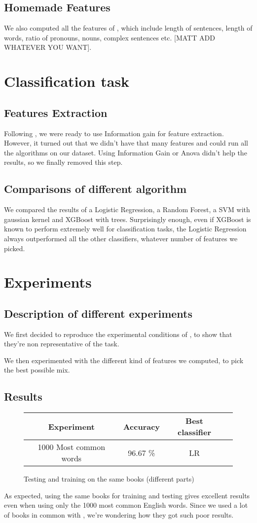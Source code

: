 \documentclass[10pt]{article}
\begin{document}
\subsection{Homemade Features}
We also computed all the features of \cite{homemade}, which include length of sentences, length of words, ratio of pronouns, nouns, complex sentences etc. [MATT ADD WHATEVER YOU WANT].

\section{Classification task}
\subsection{Features Extraction}
Following \cite{Parse}, we were ready to use Information gain for feature extraction. However, it turned out that we didn't have that many features and could run all the algorithms on our dataset. Using Information Gain or Anova didn't help the results, so we finally removed this step.

\subsection{Comparisons of different algorithm}
We compared the results of a Logistic Regression, a Random Forest, a SVM with gaussian kernel and XGBoost with trees. Surprisingly enough, even if XGBoost is known to perform extremely well for classification tasks, the Logistic Regression always outperformed all the other classifiers, whatever number of features we picked.

\section{Experiments}
\subsection{Description of different experiments}
We first decided to reproduce the experimental conditions of \cite{homemade}, to show that they're non representative of the task.


We then experimented with the different kind of features we computed, to pick the best possible mix.

\subsection{Results}
\begin{figure}[h]
\centering\begin{tabular}{|c|c|c|c|}
\hline 
Experiment & Accuracy & Best classifier\\
\hline 
1000 Most common words & 96.67 \% & LR \\
\hline
\end{tabular}
\caption{Testing and training on the same books (different parts)}
\end{figure}
As expected, using the same books for training and testing gives excellent results even when using only the 1000 most common English words. Since we used a lot of books in common with \cite{homemade}, we're wondering how they got such poor results.
\end{document}
